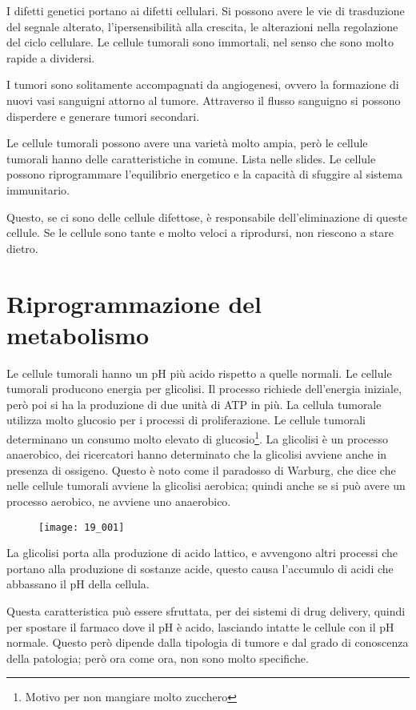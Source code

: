 I difetti genetici portano ai difetti cellulari. Si possono avere le vie
di trasduzione del segnale alterato, l'ipersensibilità alla crescita, le
alterazioni nella regolazione del ciclo cellulare. Le cellule tumorali
sono immortali, nel senso che sono molto rapide a dividersi.

I tumori sono solitamente accompagnati da angiogenesi, ovvero la
formazione di nuovi vasi sanguigni attorno al tumore. Attraverso il
flusso sanguigno si possono disperdere e generare tumori secondari.

Le cellule tumorali possono avere una varietà molto ampia, però le
cellule tumorali hanno delle caratteristiche in comune. Lista nelle
slides. Le cellule possono riprogrammare l'equilibrio energetico e la
capacità di sfuggire al sistema immunitario.

Questo, se ci sono delle cellule difettose, è responsabile
dell'eliminazione di queste cellule. Se le cellule sono tante e molto
veloci a riprodursi, non riescono a stare dietro.

\section{Riprogrammazione del metabolismo}

Le cellule tumorali hanno un pH più acido rispetto a quelle normali. Le
cellule tumorali producono energia per glicolisi. Il processo richiede
dell'energia iniziale, però poi si ha la produzione di due unità di ATP
in più. La cellula tumorale utilizza molto glucosio per i processi di
proliferazione. Le cellule tumorali determinano un consumo molto elevato
di glucosio\footnote{Motivo per non mangiare molto zucchero}. La
glicolisi è un processo anaerobico, dei ricercatori hanno determinato
che la glicolisi avviene anche in presenza di ossigeno. Questo è noto
come il paradosso di Warburg, che dice che nelle cellule tumorali
avviene la glicolisi aerobica; quindi anche se si può avere un processo
aerobico, ne avviene uno anaerobico.

\begin{figure}[H]
  \centering
  \texttt{[image: 19\_001]}
\end{figure}

La glicolisi porta alla produzione di acido lattico, e avvengono altri
processi che portano alla produzione di sostanze acide, questo causa
l'accumulo di acidi che abbassano il pH della cellula.

Questa caratteristica può essere sfruttata, per dei sistemi di drug
delivery, quindi per spostare il farmaco dove il pH è acido, lasciando
intatte le cellule con il pH normale. Questo però dipende dalla
tipologia di tumore e dal grado di conoscenza della patologia; però ora
come ora, non sono molto specifiche.

